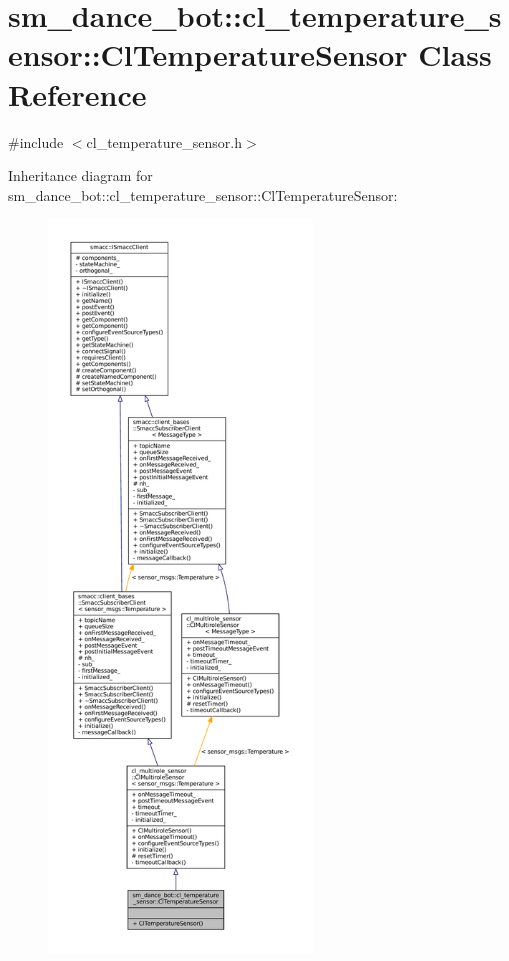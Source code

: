 \hypertarget{classsm__dance__bot_1_1cl__temperature__sensor_1_1ClTemperatureSensor}{}\section{sm\+\_\+dance\+\_\+bot\+:\+:cl\+\_\+temperature\+\_\+sensor\+:\+:Cl\+Temperature\+Sensor Class Reference}
\label{classsm__dance__bot_1_1cl__temperature__sensor_1_1ClTemperatureSensor}


{\ttfamily \#include $<$cl\+\_\+temperature\+\_\+sensor.\+h$>$}



Inheritance diagram for sm\+\_\+dance\+\_\+bot\+:\+:cl\+\_\+temperature\+\_\+sensor\+:\+:Cl\+Temperature\+Sensor\+:
\nopagebreak
\begin{figure}[H]
\begin{center}
\leavevmode
\includegraphics[height=550pt]{classsm__dance__bot_1_1cl__temperature__sensor_1_1ClTemperatureSensor__inherit__graph}
\end{center}
\end{figure}



